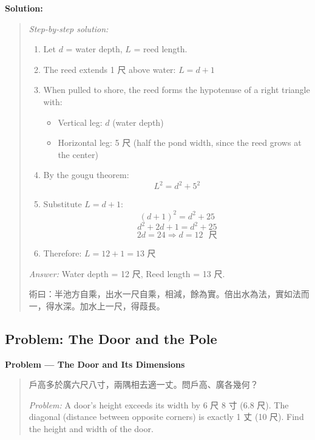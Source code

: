 \documentclass[11pt,a4paper]{article}
\newcommand{\zh}[1]{{#1}}
\newenvironment{chproblem}[1][]{%
  \par\medskip\noindent\textbf{\textcolor{sectioncolor}{#1}}\par\nopagebreak
  \begin{quote}\small
}{%
  \end{quote}\medskip
}
\newenvironment{chsolution}{%
  \par\medskip\noindent\textbf{\textcolor{notecolor}{Solution:}}\par\nopagebreak
  \begin{quote}\small
}{%
  \end{quote}\medskip
}
\newenvironment{stepbystep}{%
  \par\smallskip\noindent\textit{Step-by-step solution:}\par\nopagebreak
  \begin{enumerate}[leftmargin=2em,label=\textbf{Step \arabic*:},ref=\arabic*]
}{%
  \end{enumerate}\medskip
}
\begin{document}
\begin{chsolution}
\begin{stepbystep}
\item Let $d$ = water depth, $L$ = reed length.

\item The reed extends 1 \zh{尺} above water: $L = d + 1$

\item When pulled to shore, the reed forms the hypotenuse of a right triangle
with:
\begin{itemize}
\item Vertical leg: $d$ (water depth)
\item Horizontal leg: 5 \zh{尺} (half the pond width, since the reed grows at the center)
\end{itemize}

\item By the gougu theorem:
\[
L^2 = d^2 + 5^2
\]

\item Substitute $L = d + 1$:
\[
(d+1)^2 = d^2 + 25
\]
\[
d^2 + 2d + 1 = d^2 + 25
\]
\[
2d = 24 \Rightarrow d = 12 \text{ \zh{尺}}
\]

\item Therefore: $L = 12 + 1 = 13$ \zh{尺}
\end{stepbystep}

\textit{Answer:} Water depth = 12 \zh{尺}, Reed length = 13 \zh{尺}.

\zh{術曰：半池方自乘，出水一尺自乘，相減，餘為實。倍出水為法，實如法而一，得水深。加水上一尺，得葭長。}
\end{chsolution}

\subsection{Problem: The Door and the Pole}

\begin{chproblem}[Problem --- The Door and Its Dimensions]
\zh{戶高多於廣六尺八寸，兩隅相去適一丈。問戶高、廣各幾何？}

\medskip
\textit{Problem:} A door's height exceeds its width by 6 \zh{尺} 8 \zh{寸}
(6.8 \zh{尺}). The diagonal (distance between opposite corners) is exactly 1
\zh{丈} (10 \zh{尺}). Find the height and width of the door.
\end{chproblem}
\end{document}
